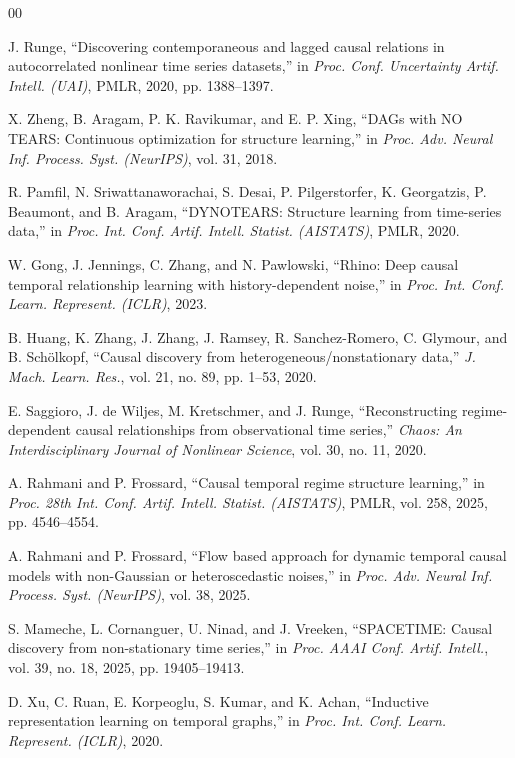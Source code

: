 \documentclass{ieeeaccess}
\begin{document}
\begin{thebibliography}{00}

 J. Runge, ``Discovering contemporaneous and lagged causal relations in autocorrelated nonlinear time series datasets,'' in \emph{Proc. Conf. Uncertainty Artif. Intell. (UAI)}, PMLR, 2020, pp. 1388--1397.

 X. Zheng, B. Aragam, P. K. Ravikumar, and E. P. Xing, ``DAGs with NO TEARS: Continuous optimization for structure learning,'' in \emph{Proc. Adv. Neural Inf. Process. Syst. (NeurIPS)}, vol. 31, 2018.

 R. Pamfil, N. Sriwattanaworachai, S. Desai, P. Pilgerstorfer, K. Georgatzis, P. Beaumont, and B. Aragam, ``DYNOTEARS: Structure learning from time-series data,'' in \emph{Proc. Int. Conf. Artif. Intell. Statist. (AISTATS)}, PMLR, 2020.

 W. Gong, J. Jennings, C. Zhang, and N. Pawlowski, ``Rhino: Deep causal temporal relationship learning with history-dependent noise,'' in \emph{Proc. Int. Conf. Learn. Represent. (ICLR)}, 2023.

 B. Huang, K. Zhang, J. Zhang, J. Ramsey, R. Sanchez-Romero, C. Glymour, and B. Sch{\"o}lkopf, ``Causal discovery from heterogeneous/nonstationary data,'' \emph{J. Mach. Learn. Res.}, vol. 21, no. 89, pp. 1--53, 2020.

 E. Saggioro, J. de Wiljes, M. Kretschmer, and J. Runge, ``Reconstructing regime-dependent causal relationships from observational time series,'' \emph{Chaos: An Interdisciplinary Journal of Nonlinear Science}, vol. 30, no. 11, 2020.

 A. Rahmani and P. Frossard, ``Causal temporal regime structure learning,'' in \emph{Proc. 28th Int. Conf. Artif. Intell. Statist. (AISTATS)}, PMLR, vol. 258, 2025, pp. 4546--4554.

 A. Rahmani and P. Frossard, ``Flow based approach for dynamic temporal causal models with non-Gaussian or heteroscedastic noises,'' in \emph{Proc. Adv. Neural Inf. Process. Syst. (NeurIPS)}, vol. 38, 2025.

 S. Mameche, L. Cornanguer, U. Ninad, and J. Vreeken, ``SPACETIME: Causal discovery from non-stationary time series,'' in \emph{Proc. AAAI Conf. Artif. Intell.}, vol. 39, no. 18, 2025, pp. 19405--19413.

 D. Xu, C. Ruan, E. Korpeoglu, S. Kumar, and K. Achan, ``Inductive representation learning on temporal graphs,'' in \emph{Proc. Int. Conf. Learn. Represent. (ICLR)}, 2020.


\end{thebibliography}
\end{document}
